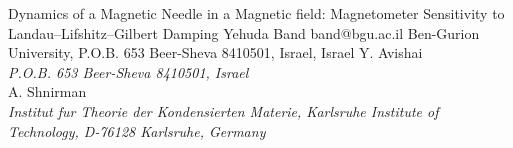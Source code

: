 \begin{conf-abstract}[]
{Dynamics of a Magnetic Needle in a Magnetic field: Magnetometer Sensitivity to Landau--Lifshitz--Gilbert Damping}
{\color{blue} Yehuda Band}
{band@bgu.ac.il}
{Ben-Gurion University, P.O.B. 653 Beer-Sheva 8410501, Israel, Israel}
{{\color{blue}Y. Avishai}\\ \textit{P.O.B. 653 Beer-Sheva 8410501, Israel}\\ 
{\color{blue}A. Shnirman}\\ \textit{ Institut fur Theorie der Kondensierten Materie, Karlsruhe Institute of Technology, D-76128 Karlsruhe, Germany}\\ 
\decofourleft \decofourright}





\printbibliography[heading=none]

\end{conf-abstract}
